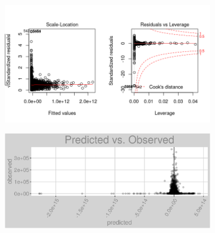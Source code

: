 \begin{figure}[h]
\centering
\begin{subfigure}{1\textwidth}
\centering
\includegraphics[width=.99\textwidth, height=0.475\textheight]{Images/electricity_l_res_2.png}
\end{subfigure}
\begin{subfigure}{1\textwidth}
\centering
\includegraphics[width=.99\textwidth, height=0.3\textheight]{Images/electricity_l_pvo.png}
\end{subfigure}
\end{figure}
\FloatBarrier
\newpage
